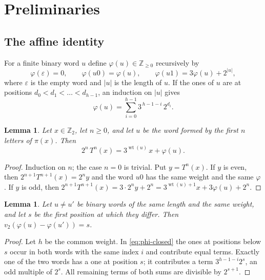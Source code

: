 \documentclass[11pt,reqno]{amsart}
\newtheorem{lemma}[theorem]{Lemma}
\theoremstyle{definition}
\theoremstyle{remark}
\newcommand{\Z}{\mathbb{Z}}
\newcommand{\Zt}{\mathbb{Z}_2}
\newcommand{\vt}{v_2}
\newcommand{\wt}{\operatorname{wt}}
\begin{document}
\section{Preliminaries}\label{sec:prelim}

\subsection{The affine identity}
For a finite binary word $u$ define $\varphi(u)\in\Z_{\ge 0}$ recursively by
\[
  \varphi(\varepsilon)=0,\qquad \varphi(u0)=\varphi(u),\qquad
  \varphi(u1)=3\varphi(u)+2^{|u|},
\]
where $\varepsilon$ is the empty word and $|u|$ is the length of $u$.  If
the ones of $u$ are at positions $d_0<d_1<\dots<d_{h-1}$, an induction on
$|u|$ gives
\begin{equation}\label{eq:phi-closed}
  \varphi(u)=\sum_{i=0}^{h-1}3^{\,h-1-i}\,2^{d_i}.
\end{equation}

\begin{lemma}\label{lem:affine}
Let $x\in\Zt$, let $n\ge 0$, and let $u$ be the word formed by the first $n$
letters of $\pi(x)$.  Then
\[
  2^{n}\,T^{n}(x)=3^{\wt(u)}\,x+\varphi(u).
\]
\end{lemma}

\begin{proof}
Induction on $n$; the case $n=0$ is trivial.  Put $y=T^{n}(x)$.  If $y$ is
even, then $2^{n+1}T^{n+1}(x)=2^{n}y$ and the word $u0$ has the same weight
and the same $\varphi$.  If $y$ is odd, then
$2^{n+1}T^{n+1}(x)=3\cdot 2^{n}y+2^{n}=3^{\wt(u)+1}x+3\varphi(u)+2^{n}$.
\end{proof}

\begin{lemma}\label{lem:offset}
Let $u\ne u'$ be binary words of the same length and the same weight, and
let $s$ be the first position at which they differ.  Then
$\vt(\varphi(u)-\varphi(u'))=s$.
\end{lemma}

\begin{proof}
Let $h$ be the common weight.  In \eqref{eq:phi-closed} the ones at
positions below $s$ occur in both words with the same index $i$ and
contribute equal terms.  Exactly one of the two words has a one at position
$s$; it contributes a term $3^{h-1-i}2^{s}$, an odd multiple of $2^{s}$.
All remaining terms of both sums are divisible by $2^{s+1}$.
\end{proof}
\end{document}
